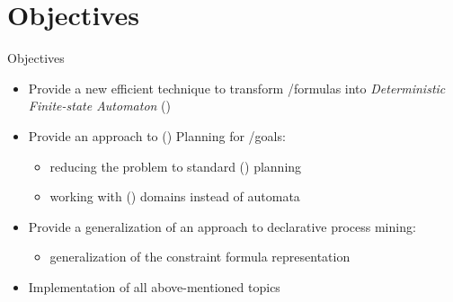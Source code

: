 \documentclass[10pt]{beamer}
\begin{document}
\section{Objectives}
\begin{frame}{Objectives}
\begin{itemize}
	\item Provide a new efficient technique to transform \LTLf/\PLTL formulas into \textit{Deterministic Finite-state Automaton} (\DFAs)		
	\vskip 0.5cm
	\item Provide an approach to (\FOND) Planning for \LTLf/\PLTL goals:
		\begin{itemize}
			\item 	reducing the problem to standard (\FOND) planning
			\item 	working with (\FOND) domains instead of automata
		\end{itemize}
	
	\vskip 0.5cm
	\item Provide a generalization of an approach to declarative process mining:
			\begin{itemize}
				\item 	generalization of the constraint formula representation
			\end{itemize}	
		
	\vskip 0.5cm	
	\item Implementation of all above-mentioned topics

\end{itemize}
\end{frame}
\end{document}
